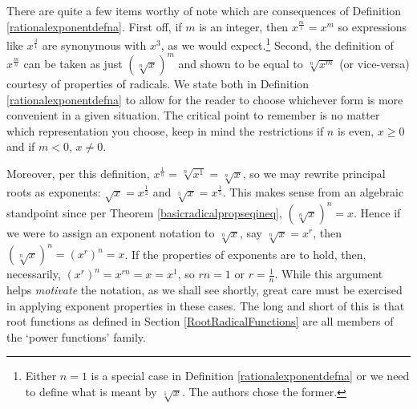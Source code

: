 \documentclass{ximera}
\begin{document}

\smallskip

There are quite a few items worthy of note which are consequences of Definition \ref{rationalexponentdefna}.  First off, if $m$ is an integer, then $x^{\frac{m}{1}}  = x^{m}$ so expressions like $x^{\frac{3}{1}}$  are synonymous with  $x^3$, as we would expect.\footnote{Either $n=1$ is a special case in Definition \ref{rationalexponentdefna} or we need to define what is meant by $\sqrt[1]{x}$.  The authors chose the former.}   Second, the definition of $x^{\frac{m}{n}}$ can be taken as just $\left(\sqrt[n]{x}\right)^m$ and shown to be equal to $\sqrt[n]{x^m}$ (or vice-versa) courtesy of properties of radicals.  We state both in  Definition \ref{rationalexponentdefna} to allow for the reader to choose whichever form is more convenient in a given situation.  The  critical point to remember is no matter which representation you choose, keep in mind the restrictions if $n$ is even, $x \geq 0$ and if $m < 0$, $x \neq 0$.  

Moreover,  per this definition,  $x^{\frac{1}{n}} = \sqrt[n]{x^{1}} = \sqrt[n]{x}$, so we may rewrite principal roots as exponents: $\sqrt{x} = x^{\frac{1}{2}}$ and $\sqrt[5]{x} = x^{\frac{1}{5}}$. This makes sense from an algebraic standpoint since per Theorem \ref{basicradicalpropseqineq}, $\left(\sqrt[n]{x} \right)^n = x$.  Hence if we were to assign an exponent notation to  $\sqrt[n]{x}$, say $\sqrt[n]{x} = x^r$, then  $\left(\sqrt[n]{x}\right)^n = (x^r)^n = x$.  If the properties of exponents are to hold, then, necessarily, $ (x^r)^n = x^{rn} = x = x^{1}$, so $rn = 1$ or $r = \frac{1}{n}$. While this argument helps \textit{motivate} the notation, as we shall see shortly, great care must be exercised in applying exponent properties in these cases.  The long and short of this is that root functions as defined in Section \ref{RootRadicalFunctions} are all members of the `power functions' family.
  
\end{document}
